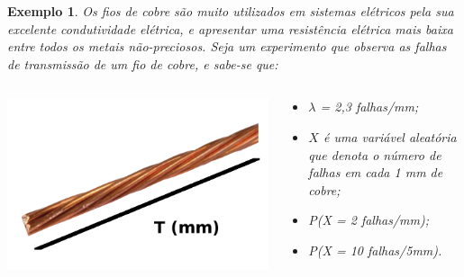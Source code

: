 \documentclass{beamer}
\theoremstyle{plain}
\newtheorem{exem}{Exemplo}
\begin{document}
  \begin{frame}
    \begin{exem}
    	Os fios de cobre são muito utilizados em sistemas elétricos pela sua excelente condutividade elétrica, e apresentar uma resistência elétrica mais baixa entre todos os metais não-preciosos. Seja um experimento que observa as falhas de transmissão de um fio de cobre, e sabe-se que:
    	\begin{columns}
    		\begin{column}{5cm}
              \begin{center}
              	\includegraphics[scale = 0.6]{fiocobre}
              \end{center}
    		\end{column}
    		\begin{column}{5cm}
    		  \begin{itemize}
    		  	\item $\lambda$ = 2,3 falhas/mm;\pause
    		  	\item $X$ é uma variável aleatória que denota o número de falhas em cada 1 mm de cobre;\pause
    		  	\item P(X = 2 falhas/mm);\pause
    		  	\item P(X = 10 falhas/5mm).
    		  \end{itemize}
    		\end{column}
    	\end{columns}
    \end{exem}
  \end{frame}
\end{document}
